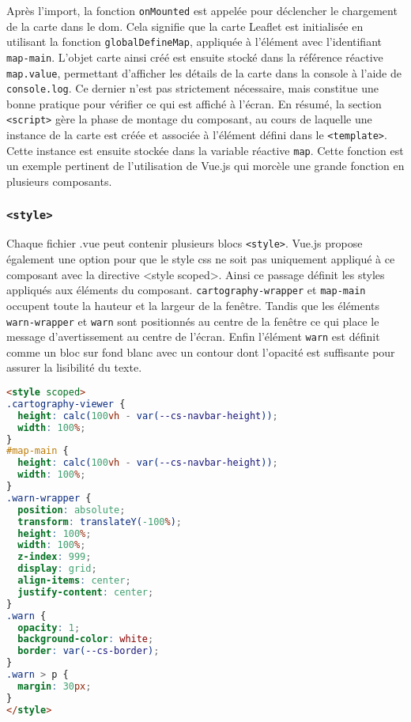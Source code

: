 Après l'import, la fonction \texttt{onMounted} est appelée pour déclencher le chargement de la carte dans le \acrshort{dom}. Cela signifie que la carte Leaflet est initialisée en utilisant la fonction \texttt{globalDefineMap}, appliquée à l'élément avec l'identifiant \texttt{map-main}. L'objet carte ainsi créé est ensuite stocké dans la référence réactive \texttt{map.value}, permettant d'afficher les détails de la carte dans la console à l'aide de \texttt{console.log}. Ce dernier n'est pas strictement nécessaire, mais constitue une bonne pratique pour vérifier ce qui est affiché à l'écran. En résumé, la section \texttt{<script>} gère la phase de montage du composant, au cours de laquelle une instance de la carte est créée et associée à l'élément défini dans le \texttt{<template>}. Cette instance est ensuite stockée dans la variable réactive \texttt{map}. Cette fonction est un exemple pertinent de l'utilisation de Vue.js qui morcèle une grande fonction en plusieurs composants. 


\subsubsection{\texttt{<style>}}
Chaque fichier .vue peut contenir plusieurs blocs \texttt{<style>}. Vue.js propose également une option pour que le style  \acrshort{css} ne soit pas uniquement appliqué à ce composant avec la directive <style scoped>. Ainsi ce passage définit les styles appliqués aux éléments du composant. \texttt{cartography-wrapper} et \texttt{map-main} occupent toute la hauteur et la largeur de la fenêtre. Tandis que les éléments \texttt{warn-wrapper} et \texttt{warn} sont positionnés au centre de la fenêtre ce qui place le message d'avertissement au centre de l'écran. Enfin l'élément \texttt{warn} est définit comme un bloc sur fond blanc avec un contour dont l'opacité est suffisante pour assurer la lisibilité du texte. 
    
\begin{lstlisting}[language=HTML, caption=Code HTML du fond de carte pour la balise <style> en Vue.js]
<style scoped>
.cartography-viewer {
  height: calc(100vh - var(--cs-navbar-height));
  width: 100%;
}
#map-main {
  height: calc(100vh - var(--cs-navbar-height));
  width: 100%;
}
.warn-wrapper {
  position: absolute;
  transform: translateY(-100%);
  height: 100%;
  width: 100%;
  z-index: 999;
  display: grid;
  align-items: center;
  justify-content: center;
}
.warn {
  opacity: 1;
  background-color: white;
  border: var(--cs-border);
}
.warn > p {
  margin: 30px;
}
</style>
\end{lstlisting}


